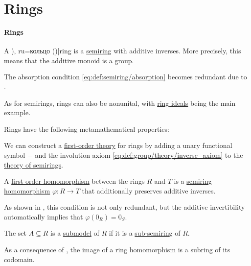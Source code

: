 \section{Rings}\label{sec:rings}

\paragraph{Rings}

\begin{definition}\label{def:ring}
  A \term[bg=пръстен (\cite[391]{Обрешков1962ВисшаАлгебра}), ru=кольцо (\cite[def. 1.3.1]{Винберг2014Алгебра})]{ring} is a \hyperref[def:semiring]{semiring} with additive inverses. More precisely, this means that the additive monoid is a group.

  The absorption condition \eqref{eq:def:semiring/absorption} becomes redundant due to .

  As for semirings, rings can also be nonunital, with \hyperref[def:semiring_ideal]{ring ideals} being the main example.

  Rings have the following metamathematical properties:
  \begin{thmenum}
    \mimprovised We can construct a \hyperref[def:first_order_theory]{first-order theory} for rings by adding a unary functional symbol \( - \) and the involution axiom \eqref{eq:def:group/theory/inverse_axiom} to the \hyperref[def:semiring/theory]{theory of semirings}.

     A \hyperref[def:first_order_homomorphism]{first-order homomorphism} between the rings \( R \) and \( T \) is a \hyperref[def:semiring/homomorphism]{semiring homomorphism} \( \varphi: R \to T \) that additionally preserves additive inverses.

    As shown in , this condition is not only redundant, but the additive invertibility automatically implies that \( \varphi(0_R) = 0_S \).

     The set \( A \subseteq R \) is a \hyperref[def:first_order_submodel]{submodel} of \( R \) if it is a \hyperref[def:semiring]{sub-semiring} of \( R \).

    As a consequence of , the image of a ring homomorphism is a subring of its codomain.


\end{thmenum}
\end{definition}
